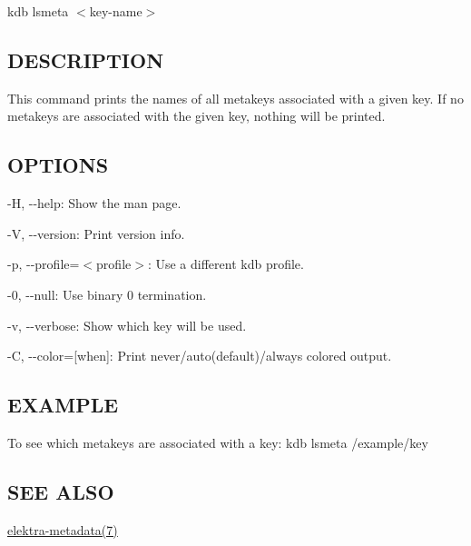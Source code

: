 {\ttfamily kdb lsmeta $<$key-\/name$>$}

\subsection*{D\+E\+S\+C\+R\+I\+P\+T\+I\+O\+N}

This command prints the names of all metakeys associated with a given key. If no metakeys are associated with the given key, nothing will be printed.

\subsection*{O\+P\+T\+I\+O\+N\+S}


\begin{DoxyItemize}
\item {\ttfamily -\/\+H}, {\ttfamily -\/-\/help}\+: Show the man page.
\item {\ttfamily -\/\+V}, {\ttfamily -\/-\/version}\+: Print version info.
\item {\ttfamily -\/p}, {\ttfamily -\/-\/profile}=$<$profile$>$\+: Use a different kdb profile.
\item {\ttfamily -\/0}, {\ttfamily -\/-\/null}\+: Use binary 0 termination.
\item {\ttfamily -\/v}, {\ttfamily -\/-\/verbose}\+: Show which key will be used.
\item {\ttfamily -\/\+C}, {\ttfamily -\/-\/color}=\mbox{[}when\mbox{]}\+: Print never/auto(default)/always colored output.
\end{DoxyItemize}

\subsection*{E\+X\+A\+M\+P\+L\+E}

To see which metakeys are associated with a key\+: {\ttfamily kdb lsmeta /example/key}

\subsection*{S\+E\+E A\+L\+S\+O}


\begin{DoxyItemize}
\item \hyperlink{md_doc_help_elektra-metadata_doc_help_elektra-metadata_md}{elektra-\/metadata(7)} 
\end{DoxyItemize}